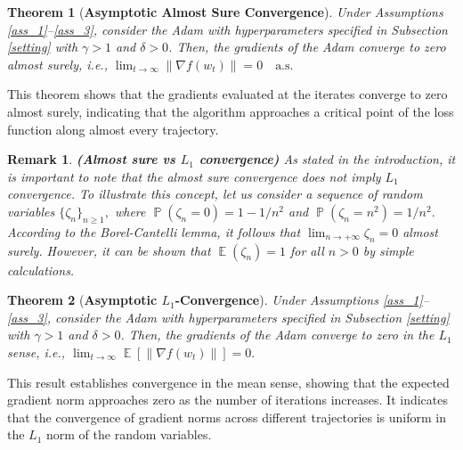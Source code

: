 \documentclass{article} %
\newtheorem{rem}{Remark}
\newtheorem{thm}{Theorem}[section]
\DeclareMathOperator{\Expect}{\mathbb{E}}
\DeclareMathOperator{\Pro}{\mathbb{P}}
\begin{document}
\begin{thm}[\textbf{Asymptotic Almost Sure Convergence}]
\label{thm:almost_sure}
Under Assumptions \ref{ass_1}--\ref{ass_3}, consider the Adam with hyperparameters specified in Subsection \ref{setting} with \( \gamma > 1 \) and \( \delta > 0 \). Then, the gradients of the Adam converge to zero almost surely, i.e.,
\(
\lim_{t \to \infty} \|\nabla f(w_t)\| = 0 \quad \text{a.s.}
\)
\end{thm}
This theorem shows that the gradients evaluated at the iterates converge to zero almost surely, indicating that the algorithm approaches a critical point of the loss function along almost every trajectory.
\begin{rem}\textbf{(Almost sure vs $L_{1}$ convergence)}
As stated in the introduction, it is important to note that the almost sure convergence does not imply $L_1$ convergence. To illustrate this concept, let us consider a sequence of random variables $\{\zeta_{n}\}_{n\ge 1},$ where $\Pro(\zeta_{n}=0)=1-1/n^{2}$ and $\Pro(\zeta_{n}=n^{2})=1/n^{2}.$ According to \textit{the Borel-Cantelli lemma}, it follows that $\lim_{n\rightarrow+\infty}\zeta_{n}=0$ almost surely. However, it can be shown that $\Expect(\zeta_{n})=1$ for all $n>0$ by simple calculations.
\end{rem}
\begin{thm}[\textbf{Asymptotic \( L_1 \)-Convergence}]
\label{thm:l2}
Under Assumptions \ref{ass_1}--\ref{ass_3}, consider the Adam with hyperparameters specified in Subsection \ref{setting} with \( \gamma > 1 \) and \( \delta > 0 \). Then, the gradients of the Adam converge to zero in the \( L_{1} \) sense, i.e.,
\(
\lim_{t \to \infty}\Expect[\|\nabla f(w_t)\|] = 0.
\)
\end{thm}
This result establishes convergence in the mean sense, showing that the expected gradient norm approaches zero as the number of iterations increases. It indicates that the convergence of gradient norms across different trajectories is uniform in the \(L_1\) norm of the random variables.
\end{document}
